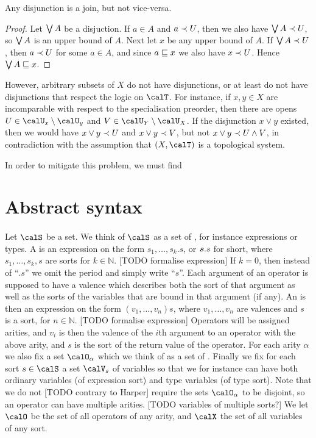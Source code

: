\documentclass[a4paper, 11pt, article, danish, oneside]{memoir}
\newcommand{\naturals}{\mathbb{N}}
\newcommand{\meet}{\land}
\newcommand{\join}{\lor}
\DeclareMathOperator*{\smallbigvee}{\textstyle\bigvee}
\DeclareMathOperator*{\bigjoin}{\mathchoice
    {\smallbigvee}%
    {\bigvee}%
    {\bigvee}%
    {\bigvee}%
}
\newcommand{\newpar}{\paragraph{}}
\newcommand{\setVar}{\calV}
\begin{document}
\begin{proposition}
    Any disjunction is a join, but not vice-versa.
\end{proposition}

\begin{proof}
    Let $\bigjoin A$ be a disjuction. If $a \in A$ and $a \prec U$, then we also have $\bigjoin A \inpoint U$, so $\bigjoin A$ is an upper bound of $A$. Next let $x$ be any upper bound of $A$. If $\bigjoin A \inpoint U$, then $a \prec U$ for some $a \in A$, and since $a \sqsubseteq x$ we also have $x \prec U$. Hence $\bigjoin A \specs x$.
\end{proof}

However, arbitrary subsets of $X$ do not have disjunctions, or at least do not have disjunctions that respect the logic on $\calT$. For instance, if $x,y \in X$ are incomparable with respect to the specialisation preorder, then there are opens $U \in \opens{x} \setminus \opens{y}$ and $V \in \opens{Y} \setminus \opens{X}$. If the disjunction $x \join y$ existed, then we would have $x \join y \inpoint U$ and $x \join y \inpoint V$, but not $x \join y \inpoint U \meet V$, in contradiction with the assumption that $(X,\calT)$ is a topological system.

In order to mitigate this problem, we must find 



\section{Abstract syntax}

\newpar

Let $\setSort$ be a set. We think of $\setSort$ as a set of , for instance expressions or types. A  is an expression on the form $s_1,\ldots,s_k.s$, or $\bm{s}.s$ for short, where $s_1,\ldots,s_k,s$ are sorts for $k \in \naturals$. [TODO formalise expression] If $k = 0$, then instead of \enquote{$.s$} we omit the period and simply write \enquote{$s$}. Each argument of an operator is supposed to have a valence which describes both the sort of that argument as well as the sorts of the variables that are bound in that argument (if any). An  is then an expression on the form $(v_1, \ldots, v_n)s$, where $v_1, \ldots, v_n$ are valences and $s$ is a sort, for $n \in \naturals$. [TODO formalise expression] Operators will be assigned arities, and $v_i$ is then the valence of the $i$th argument to an operator with the above arity, and $s$ is the sort of the return value of the operator. For each arity $\alpha$ we also fix a set $\setOp_\alpha$ which we think of as a set of . Finally we fix for each sort $s \in \calS$ a set $\setVar_s$ of variables so that we for instance can have both ordinary variables (of expression sort) and type variables (of type sort). Note that we do not [TODO contrary to Harper] require the sets $\setOp_\alpha$ to be disjoint, so an operator can have multiple arities. [TODO variables of multiple sorts?] We let $\setOp$ be the set of all operators of any arity, and $\calX$ the set of all variables of any sort.
\end{document}
